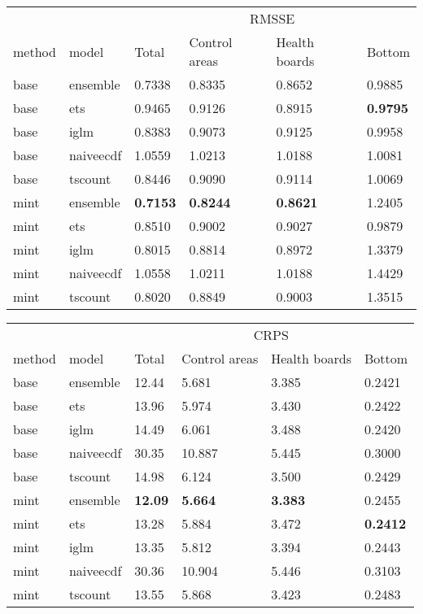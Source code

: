 \documentclass[
  authoryear,
  preprint,
  3p]{elsarticle}
\begin{document}
\begin{table}
\begin{minipage}[t]{\linewidth}
{\centering
\begin{tabular}[t]{llllll}
\toprule
\multicolumn{2}{c}{ } & \multicolumn{4}{c}{RMSSE} \\
\cmidrule(l{3pt}r{3pt}){3-6}
method & model & Total & Control areas & Health boards & Bottom\\
\midrule
base & ensemble & 0.7338 & 0.8335 & 0.8652 & 0.9885\\
base & ets & 0.9465 & 0.9126 & 0.8915 & \textbf{0.9795}\\
base & iglm & 0.8383 & 0.9073 & 0.9125 & 0.9958\\
base & naiveecdf & 1.0559 & 1.0213 & 1.0188 & 1.0081\\
base & tscount & 0.8446 & 0.9090 & 0.9114 & 1.0069\\
\addlinespace
mint & ensemble & \textbf{0.7153} & \textbf{0.8244} & \textbf{0.8621} & 1.2405\\
mint & ets & 0.8510 & 0.9002 & 0.9027 & 0.9879\\
mint & iglm & 0.8015 & 0.8814 & 0.8972 & 1.3379\\
mint & naiveecdf & 1.0558 & 1.0211 & 1.0188 & 1.4429\\
mint & tscount & 0.8020 & 0.8849 & 0.9003 & 1.3515\\
\bottomrule
\end{tabular}

}

\end{minipage}%
\newline
\begin{minipage}[t]{\linewidth}

{\centering 

\tabularnewline

\centering
\begin{tabular}[t]{llllll}
\toprule
\multicolumn{2}{c}{ } & \multicolumn{4}{c}{CRPS} \\
\cmidrule(l{3pt}r{3pt}){3-6}
method & model & Total & Control areas & Health boards & Bottom\\
\midrule
base & ensemble & 12.44 & 5.681 & 3.385 & 0.2421\\
base & ets & 13.96 & 5.974 & 3.430 & 0.2422\\
base & iglm & 14.49 & 6.061 & 3.488 & 0.2420\\
base & naiveecdf & 30.35 & 10.887 & 5.445 & 0.3000\\
base & tscount & 14.98 & 6.124 & 3.500 & 0.2429\\
\addlinespace
mint & ensemble & \textbf{12.09} & \textbf{ 5.664} & \textbf{3.383} & 0.2455\\
mint & ets & 13.28 & 5.884 & 3.472 & \textbf{0.2412}\\
mint & iglm & 13.35 & 5.812 & 3.394 & 0.2443\\
mint & naiveecdf & 30.36 & 10.904 & 5.446 & 0.3103\\
mint & tscount & 13.55 & 5.868 & 3.423 & 0.2483\\
\bottomrule
\end{tabular}

}
\end{minipage}
\end{table}
\end{document}
